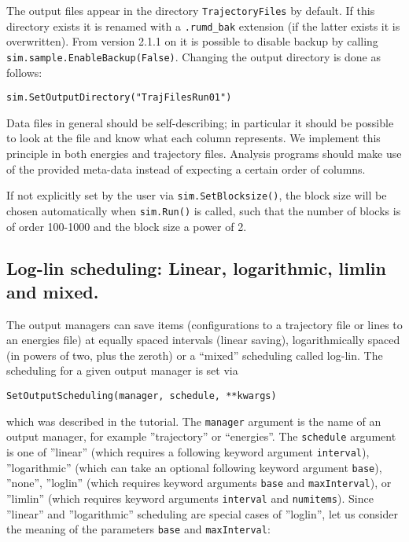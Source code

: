 \documentclass[a4paper]{article}
\begin{document}
The output files appear in the directory \verb|TrajectoryFiles| by default. If
this directory exists it is renamed with a \verb|.rumd_bak| extension (if the
latter exists it is overwritten). From version 2.1.1 on it is possible to
disable backup by calling  \verb|sim.sample.EnableBackup(False)|.
Changing the output directory is done as follows:

\begin{verbatim}
sim.SetOutputDirectory("TrajFilesRun01")
\end{verbatim}
Data files in general should be self-describing; in particular it should be 
possible to look at the file and know what each column represents. We implement
this principle in both energies and trajectory files. Analysis programs should
make use of the provided meta-data instead of expecting a certain order of
columns. 

If not explicitly set by the user via \verb|sim.SetBlocksize()|, the
block size will be 
chosen automatically when \verb|sim.Run()| is called, such that the number of
blocks is of order 100-1000 and the block size a power of 2.

\subsection{Log-lin scheduling: Linear, logarithmic, limlin and mixed.}

The output managers can save items (configurations to a trajectory file or
lines to an energies file) at equally spaced intervals (linear saving), 
logarithmically spaced (in powers of two, plus the zeroth) or a ``mixed'' 
scheduling called log-lin. The scheduling for a given output manager is
set via
\begin{verbatim}
SetOutputScheduling(manager, schedule, **kwargs)
\end{verbatim} 
which was described in the tutorial. The \verb|manager| argument is the name of
an output manager, for example ''trajectory'' or ``energies''. The 
\verb|schedule| argument is one of ''linear'' (which requires a following
keyword argument \verb|interval|), ''logarithmic'' (which can take an optional
following keyword argument \verb|base|), ''none'', ''loglin''
(which requires keyword arguments \verb|base| and \verb|maxInterval|), or ''limlin'' (which requires keyword arguments \verb|interval| and \verb|numitems|). Since 
''linear'' and ''logarithmic'' scheduling are special cases of ''loglin'', let
us consider the meaning of the parameters \verb|base| and \verb|maxInterval|:
\end{document}
